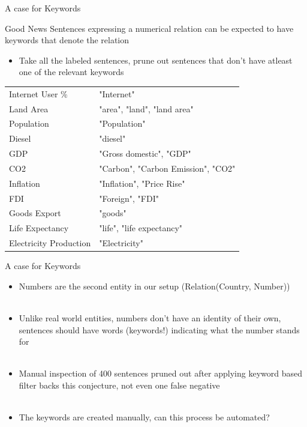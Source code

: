 \documentclass{beamer}
\begin{document}
\begin{frame}{A case for Keywords}
 \begin{exampleblock}{Good News}
  Sentences expressing a numerical relation can be expected to have keywords that denote the relation
 \end{exampleblock}

 \begin{itemize}
  \item Take all the labeled sentences, prune out sentences that don't have atleast one of the relevant keywords
 \end{itemize}
 \begin{table}
  \tiny

 \begin{tabular}{|l|l|}
  \hline
  Internet User \% & "Internet" \\
Land Area & "area", "land", "land area" \\
Population &"Population" \\
Diesel & "diesel" \\
GDP &"Gross domestic", "GDP" \\
CO2 &"Carbon", "Carbon Emission", "CO2" \\
Inflation & "Inflation", "Price Rise" \\
FDI & "Foreign", "FDI" \\
Goods Export & "goods" \\
Life Expectancy & "life", "life expectancy" \\
Electricity Production & "Electricity" \\
 \hline
 \end{tabular}
 \end{table}
\end{frame}
\begin{frame}{A case for Keywords}
\begin{itemize} 
  \item Numbers are the second entity in our setup (Relation(Country, Number)) \\~\\
  \item Unlike real world entities, numbers don't have an identity of their own, sentences should have words (keywords!) indicating what the number stands for \\~\\
  \item Manual inspection of 400 sentences pruned out after applying keyword based filter backs this conjecture, not even one false negative \\~\\
  \item The keywords are created manually, can this process be automated?
\end{itemize}
\end{frame}
\end{document}
